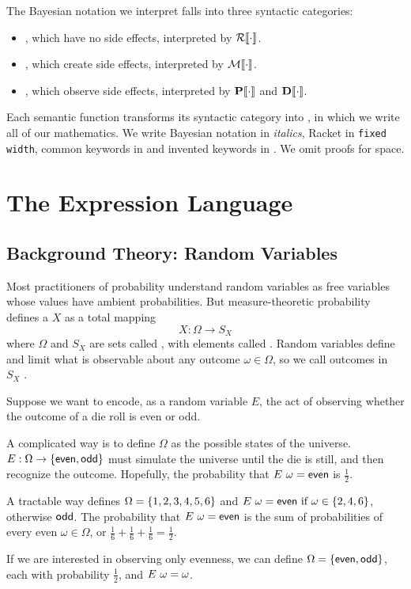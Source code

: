 The Bayesian notation we interpret falls into three syntactic categories:
\begin{itemize}
\item {}, which have no side effects, interpreted by $\mathcal{R}\!\left\llbracket{\cdot}\right\rrbracket$.
\item {}, which create side effects, interpreted by $\mathcal{M}\!\left\llbracket{\cdot}\right\rrbracket$.
\item {}, which observe side effects, interpreted by $\mathbf{P}\!\left\llbracket{\cdot}\right\rrbracket$ and $\mathbf{D}\!\left\llbracket{\cdot}\right\rrbracket$.
\end{itemize}
Each semantic function transforms its syntactic category into \targetlang, in which we write all of our mathematics.
We write Bayesian notation in \textit{italics}, Racket in \texttt{fixed width}, common keywords in  and invented keywords in . We omit proofs for space.


\section{The Expression Language}
\label{section:random-variables}

\subsection{Background Theory: Random Variables}

Most practitioners of probability understand random variables as free variables whose values have ambient probabilities. But measure-theoretic probability defines a  $X$ as a total mapping
\begin{equation}
	X : \Omega \to S_X
\end{equation}
where $\Omega$ and $S_X$ are sets called , with elements called . Random variables define and limit what is observable about any outcome $\omega \in \Omega$, so we call outcomes in $S_X$ .

\begin{example}
\label{example:even/odd}
Suppose we want to encode, as a random variable $E$, the act of observing whether the outcome of a die roll is even or odd.

A complicated way is to define $\Omega$ as the possible states of the universe. $E : \Omega \to \{{\mathsf{even},\mathsf{odd}}\}$ must simulate the universe until the die is still, and then recognize the outcome. Hopefully, the probability that ${E}\ {\omega} = \mathsf{even}$ is $\frac{1}{2}$.

A tractable way defines $\Omega = \{{1,2,3,4,5,6}\}$ and ${E}\ {\omega} = \mathsf{even} \text{ if } \omega \in \{{2,4,6}\}$, otherwise $\mathsf{odd}$. The probability that ${E}\ {\omega} = \mathsf{even}$ is the sum of probabilities of every even $\omega \in \Omega$, or $\tfrac{1}{6} + \tfrac{1}{6} + \tfrac{1}{6} = \tfrac{1}{2}$.

If we are interested in observing only evenness, we can define $\Omega = \{{\mathsf{even},\mathsf{odd}}\}$, each with probability $\tfrac{1}{2}$, and ${E}\ {\omega} = \omega$.
\exampleqed
\end{example}


